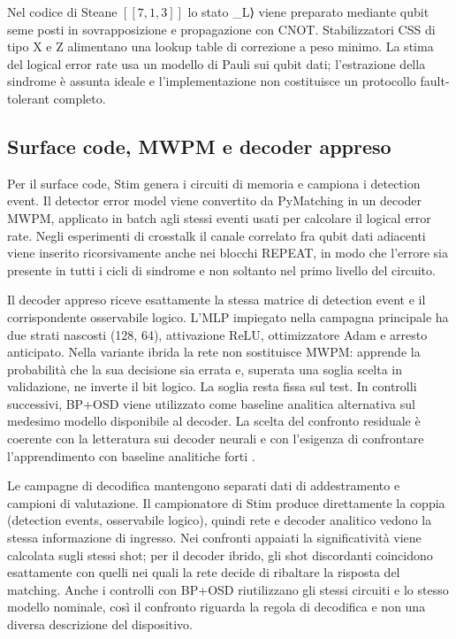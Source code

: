 Nel codice di Steane \ensuremath{[[7,1,3]]} lo stato \_L⟩ viene preparato mediante qubit seme posti in sovrapposizione e propagazione con CNOT. Stabilizzatori CSS di tipo X e Z alimentano una lookup table di correzione a peso minimo. La stima del logical error rate usa un modello di Pauli sui qubit dati; l'estrazione della sindrome è assunta ideale e l'implementazione non costituisce un protocollo fault-tolerant completo.

\subsection{Surface code, MWPM e decoder appreso}\label{sec:finale_4_6_2}

Per il surface code, Stim genera i circuiti di memoria e campiona i detection event. Il detector error model viene convertito da PyMatching in un decoder MWPM, applicato in batch agli stessi eventi usati per calcolare il logical error rate. Negli esperimenti di crosstalk il canale correlato fra qubit dati adiacenti viene inserito ricorsivamente anche nei blocchi REPEAT, in modo che l'errore sia presente in tutti i cicli di sindrome e non soltanto nel primo livello del circuito.

Il decoder appreso riceve esattamente la stessa matrice di detection event e il corrispondente osservabile logico. L'MLP impiegato nella campagna principale ha due strati nascosti (128, 64), attivazione ReLU, ottimizzatore Adam e arresto anticipato. Nella variante ibrida la rete non sostituisce MWPM: apprende la probabilità che la sua decisione sia errata e, superata una soglia scelta in validazione, ne inverte il bit logico. La soglia resta fissa sul test. In controlli successivi, BP+OSD \cite{roffe2020,panteleev2021} viene utilizzato come baseline analitica alternativa sul medesimo modello disponibile al decoder. La scelta del confronto residuale è coerente con la letteratura sui decoder neurali e con l'esigenza di confrontare l'apprendimento con baseline analitiche forti \cite{alphaqubit2024,torlaiMelko2017,yan2026,roffe2020,panteleev2021}.

Le campagne di decodifica mantengono separati dati di addestramento e campioni di valutazione. Il campionatore di Stim produce direttamente la coppia (detection events, osservabile logico), quindi rete e decoder analitico vedono la stessa informazione di ingresso. Nei confronti appaiati la significatività viene calcolata sugli stessi shot; per il decoder ibrido, gli shot discordanti coincidono esattamente con quelli nei quali la rete decide di ribaltare la risposta del matching. Anche i controlli con BP+OSD riutilizzano gli stessi circuiti e lo stesso modello nominale, così il confronto riguarda la regola di decodifica e non una diversa descrizione del dispositivo.

